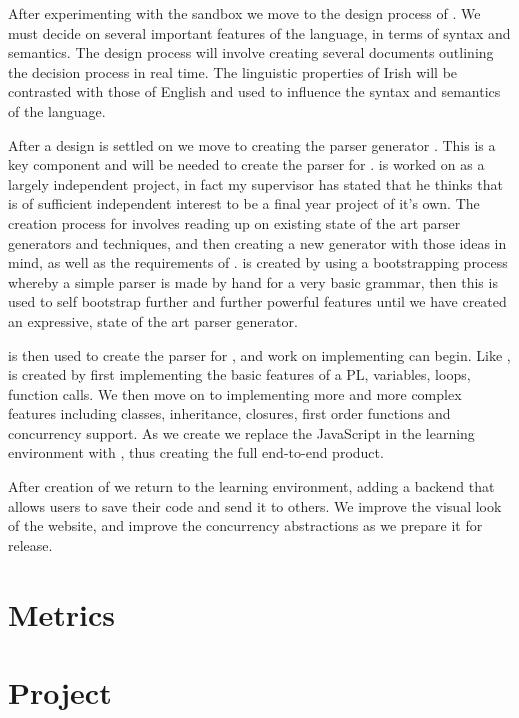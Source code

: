 After experimenting with the sandbox we move to the design process of \Setanta{}. We must decide on several important features of the language, in terms of syntax and semantics. The design process will involve creating several documents outlining the decision process in real time. The linguistic properties of Irish will be contrasted with those of English and used to influence the syntax and semantics of the language.

After a design is settled on we move to creating the parser generator \tsPEG{}. This is a key component and will be needed to create the parser for \Setanta{}. \tsPEG{} is worked on as a largely independent project, in fact my supervisor has stated that he thinks that \tsPEG{} is of sufficient independent interest to be a final year project of it's own. The creation process for \tsPEG{} involves reading up on existing state of the art parser generators and techniques, and then creating a new generator with those ideas in mind, as well as the requirements of \Setanta{}. \tsPEG{} is created by using a bootstrapping process whereby a simple parser is made by hand for a very basic grammar, then this is used to self bootstrap further and further powerful features until we have created an expressive, state of the art parser generator.

\tsPEG{} is then used to create the parser for \Setanta{}, and work on implementing \Setanta{} can begin. Like \tsPEG{}, \Setanta{} is created by first implementing the basic features of a PL, variables, loops, function calls. We then move on to implementing more and more complex features including classes, inheritance, closures, first order functions and concurrency support. As we create \Setanta{} we replace the JavaScript in the learning environment with \Setanta{}, thus creating the full end-to-end product.

After creation of \Setanta{} we return to the learning environment, adding a backend that allows users to save their code and send it to others. We improve the visual look of the website, and improve the concurrency abstractions as we prepare it for release.

\section{Metrics}
\section{Project}
